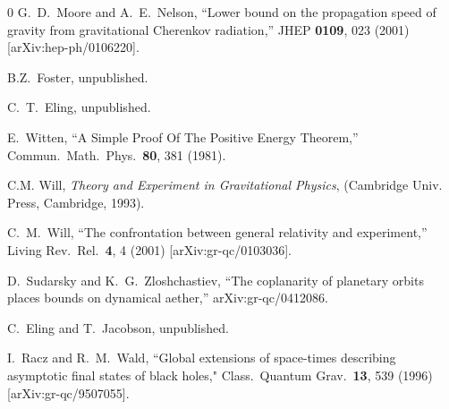 \documentclass[aps]{ws-procs9x6}
\begin{document}
\begin{thebibliography}{0}
G.~D.~Moore and A.~E.~Nelson,
``Lower bound on the propagation speed of gravity from gravitational  Cherenkov
radiation,''
JHEP {\bf 0109}, 023 (2001)
[arXiv:hep-ph/0106220].

B.Z.~Foster, unpublished.

C.~T.~Eling, unpublished.

E.~Witten,
``A Simple Proof Of The Positive Energy Theorem,''
Commun.\ Math.\ Phys.\  {\bf 80}, 381 (1981).

C.M. Will, {\it Theory and Experiment in Gravitational
Physics}, (Cambridge Univ. Press, Cambridge, 1993).

C.~M.~Will,
``The confrontation between general relativity and experiment,''
Living Rev.\ Rel.\  {\bf 4}, 4 (2001)
[arXiv:gr-qc/0103036].

D.~Sudarsky and K.~G.~Zloshchastiev,
``The coplanarity of planetary orbits places bounds on dynamical aether,''
arXiv:gr-qc/0412086.

C.~Eling and T.~Jacobson, unpublished.

I.~Racz and R.~M.~Wald, ``Global extensions of space-times
describing asymptotic final states of black holes," Class.\
Quantum Grav.\ {\bf 13}, 539 (1996) [arXiv:gr-qc/9507055].


\end{thebibliography}
\end{document}
